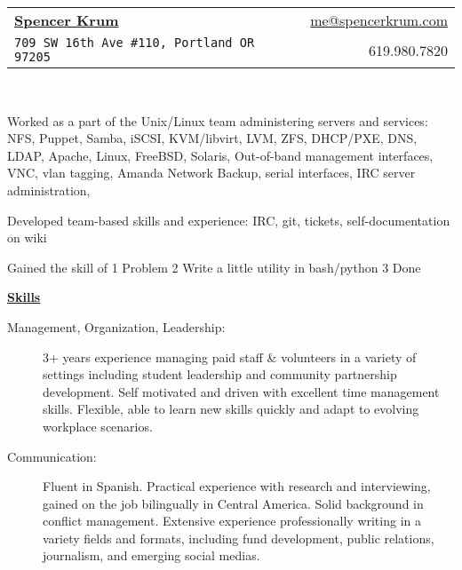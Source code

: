 \documentclass[letterpaper,11pt]{article}
\newcommand{\resheading}[1]{{\large \colorbox{mygrey}{\begin{minipage}{\textwidth}{\textbf{#1 \vphantom{p\^{E}}}}\end{minipage}}}}
\begin{document}
\newcommand{\mywebheader}{
\begin{tabular*}{7in}{l@{\extracolsep{\fill}}r}
	\textbf{\LARGE \href{www.nibalizer.com}{Spencer Krum}} & \href{mailto:me@spencerkrum.com}{me@spencerkrum.com}\\
	{\footnotesize \texttt{709 SW 16th Ave \#110, Portland OR 97205}} & \textcolor{mygreylink}{{619.980.7820}} \\
	\end{tabular*}
\\
\vspace{0.1in}}

\mywebheader
    \item Worked as a part of the Unix/Linux team administering servers and services: NFS, Puppet, Samba, iSCSI, KVM/libvirt, LVM, ZFS, DHCP/PXE, DNS,  LDAP, Apache, Linux, FreeBSD, Solaris, Out-of-band management interfaces, VNC, vlan tagging, Amanda Network Backup, serial interfaces, IRC server administration, 
    \item Developed team-based skills and experience: IRC, git, tickets, self-documentation on wiki 
    \item Gained the skill of 1 Problem 2 Write a little utility in bash/python 3 Done


\resheading{\href{http://www.derekhildreth.com/portfolio.php}{Skills}}
	\begin{description}
		\item[Management, Organization, Leadership:] {\footnotesize  3+ years experience managing paid staff \& volunteers in a variety of settings including student leadership and community partnership development. Self motivated and driven with excellent time management skills.  Flexible, able to learn new skills quickly and adapt to evolving workplace scenarios.}
        \item[Communication:] { \footnotesize Fluent in Spanish.  Practical experience with research and interviewing, gained on the job bilingually in Central America. Solid background in conflict management. Extensive experience professionally writing in a variety fields and formats, including fund development, public relations, journalism, and emerging social medias.}

	\end{description} %
\end{document}
